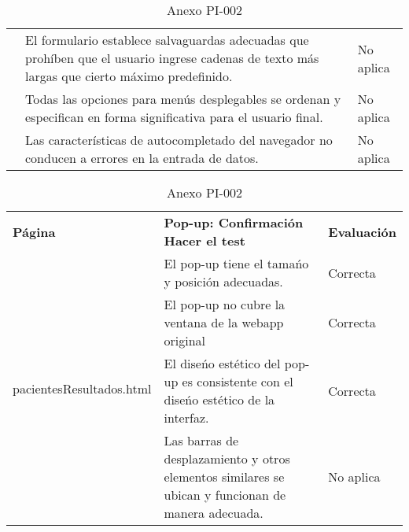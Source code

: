 \begin{table}[htpb]
\begin{tabularx}{\textwidth}{|l|X|l|}
                                           & El formulario establece salvaguardas adecuadas que prohíben que el usuario ingrese cadenas de texto más largas que cierto máximo predefinido.             & No aplica           \\ \cline{2-3} 
                                           & Todas las opciones para menús desplegables se ordenan y especifican en forma significativa para el usuario final.                                         & No aplica           \\ \cline{2-3} 
                                           & Las características de autocompletado del navegador no conducen a errores en la entrada de datos.                                                         & No aplica           \\ \hline
\end{tabularx}
\caption{Anexo PI-002}
\end{table}


\begin{table}[htpb]
\centering
\begin{tabularx}{\textwidth}{|l|X|l|}
\hline
\rowcolor[gray]{0.9}\multicolumn{3}{|l|}{\textbf{Anexo PI-002}}                                                                                                                           \\ \hline
\textbf{Página}                           & \textbf{Pop-up: Confirmación Hacer el test}                                                        & \textbf{Evaluación} \\ \hline
\multirow{4}{*}{pacientesResultados.html} & El pop-up tiene el tamańo y posición adecuadas.                                                    & Correcta            \\ \cline{2-3} 
                                          & El pop-up no cubre la ventana de la webapp original                                                & Correcta            \\ \cline{2-3} 
                                          & El diseńo estético del pop-up es consistente con el diseńo estético de la interfaz.                & Correcta            \\ \cline{2-3} 
                                          & Las barras de desplazamiento y otros elementos similares se ubican y funcionan de manera adecuada. & No aplica           \\ \hline
\end{tabularx}
\caption{Anexo PI-002}
\end{table}


